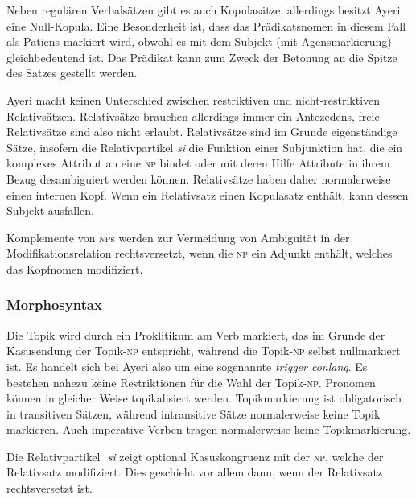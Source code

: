 \documentclass[
	12pt,
	ngerman,
]{scrartcl}
\let\q\textquote
\newcommand{\fw}[1]{\textit{#1}} %
\newcommand{\zwsp}{\mbox{​}} %
\newcommand{\rayr}[2]{\zwsp\smash{{\Tagati #1}} \emph{#2}} %
\begin{document}

Neben regulären Verbalsätzen gibt es auch Kopulasätze, allerdings besitzt Ayeri
eine Null-Kopula. Eine Besonderheit ist, dass das Prädikatsnomen in diesem Fall
als Patiens markiert wird, obwohl es mit dem Subjekt (mit Agensmarkierung)
gleichbedeutend ist. Das Prädikat kann zum Zweck der Betonung an die Spitze des
Satzes gestellt werden.

Ayeri macht keinen Unterschied zwischen restriktiven und nicht-restriktiven
Relativsätzen. Relativsätze brauchen allerdings immer ein Antezedens, freie
Relativsätze sind also nicht erlaubt. Relativsätze sind im Grunde eigenständige
Sätze, insofern die Relativpartikel \rayr{si}{si} die Funktion einer
Subjunktion hat, die ein komplexes Attribut an eine \textsc{np} bindet oder mit
deren Hilfe Attribute in ihrem Bezug desambiguiert werden können. Relativsätze
haben daher normalerweise einen internen Kopf. Wenn ein Relativsatz einen
Kopulasatz enthält, kann dessen Subjekt ausfallen.

Komplemente von \textsc{np}s werden zur Vermeidung von Ambiguität in der
Modifikationsrelation rechtsversetzt, wenn die \textsc{np} ein Adjunkt enthält,
welches das Kopfnomen modifiziert.

\subsubsection{Morphosyntax}
\label{subsubsec:morphsyn}

Die Topik wird durch ein Proklitikum am Verb markiert, das im Grunde der
Kasusendung der Topik-\textsc{np} entspricht, während die Topik-\textsc{np}
selbst nullmarkiert ist. Es handelt sich bei Ayeri also um eine sogenannte
\fw{trigger conlang}. Es bestehen nahezu keine Restriktionen für die Wahl der
Topik-\textsc{np}. Pronomen können in gleicher Weise topikalisiert werden.
Topikmarkierung ist obligatorisch in transitiven Sätzen, während intransitive
Sätze normalerweise keine Topik markieren. Auch imperative Verben tragen
normalerweise keine Topikmarkierung.

Die Relativpartikel \rayr{si}{si} zeigt optional Kasuskongruenz mit der
\textsc{np}, welche der Relativsatz modifiziert. Dies geschieht vor allem dann,
wenn der Relativsatz rechtsversetzt ist.
\end{document}
